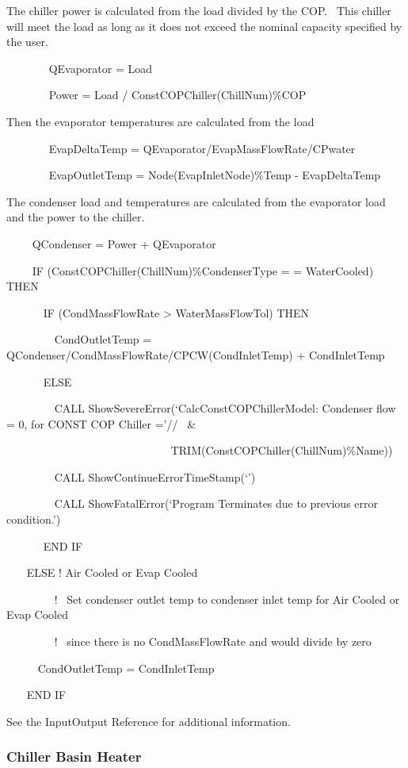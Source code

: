 The chiller power is calculated from the load divided by the COP.~ This chiller will meet the load as long as it does not exceed the nominal capacity specified by the user.

~~~~~~~ QEvaporator = Load

~~~~~~~ Power = Load / ConstCOPChiller(ChillNum)\%COP

Then the evaporator temperatures are calculated from the load

~~~~~~~ EvapDeltaTemp = QEvaporator/EvapMassFlowRate/CPwater

~~~~~~~ EvapOutletTemp = Node(EvapInletNode)\%Temp - EvapDeltaTemp

The condenser load and temperatures are calculated from the evaporator load and the power to the chiller.

~~~~ QCondenser = Power + QEvaporator

~~~~ IF (ConstCOPChiller(ChillNum)\%CondenserType = = WaterCooled) THEN

~~~~~~ IF (CondMassFlowRate \textgreater{} WaterMassFlowTol) THEN

~~~~~~~~ CondOutletTemp = QCondenser/CondMassFlowRate/CPCW(CondInletTemp) + CondInletTemp

~~~~~~ ELSE

~~~~~~~~ CALL ShowSevereError(`CalcConstCOPChillerModel: Condenser flow = 0, for CONST COP Chiller ='//~ \&

~~~~~~ ~~~~~~~~~~~~~~~~~~~~~~~TRIM(ConstCOPChiller(ChillNum)\%Name))

~~~~~~~~ CALL ShowContinueErrorTimeStamp(`')

~~~~~~~~ CALL ShowFatalError(`Program Terminates due to previous error condition.')

~~~~~~ END IF

~~~ ELSE ! Air Cooled or Evap Cooled

~~~~~~~~ !~ Set condenser outlet temp to condenser inlet temp for Air Cooled or Evap Cooled

~~~~~~~~ !~ since there is no CondMassFlowRate and would divide by zero

~~~~~ CondOutletTemp = CondInletTemp

~~~ END IF

See the InputOutput Reference for additional information.

\subsubsection{Chiller Basin Heater}\label{chiller-basin-heater-1}

